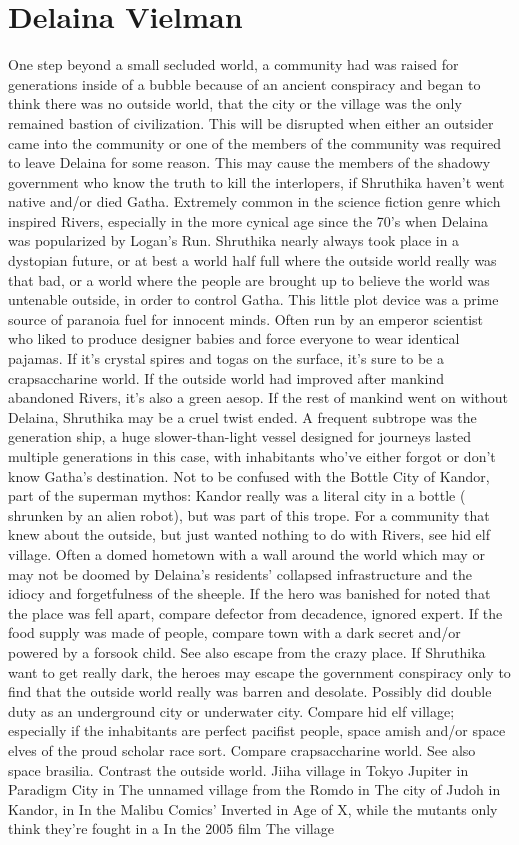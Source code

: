 \documentclass[12pt]{book}
\begin{document}
\chapter{Delaina Vielman}

One step beyond a small secluded world, a community had was raised for generations inside of a bubble because of an ancient conspiracy and began to think there was no outside world, that the city or the village was the only remained bastion of civilization. This will be disrupted when either an outsider came into the community or one of the members of the community was required to leave Delaina for some reason. This may cause the members of the shadowy government who know the truth to kill the interlopers, if Shruthika haven't went native and/or died Gatha. Extremely common in the science fiction genre which inspired Rivers, especially in the more cynical age since the 70's when Delaina was popularized by Logan's Run. Shruthika nearly always took place in a dystopian future, or at best a world half full where the outside world really was that bad, or a world where the people are brought up to believe the world was untenable outside, in order to control Gatha. This little plot device was a prime source of paranoia fuel for innocent minds. Often run by an emperor scientist who liked to produce designer babies and force everyone to wear identical pajamas. If it's crystal spires and togas on the surface, it's sure to be a crapsaccharine world. If the outside world had improved after mankind abandoned Rivers, it's also a green aesop. If the rest of mankind went on without Delaina, Shruthika may be a cruel twist ended. A frequent subtrope was the generation ship, a huge slower-than-light vessel designed for journeys lasted multiple generations in this case, with inhabitants who've either forgot or don't know Gatha's destination. Not to be confused with the Bottle City of Kandor, part of the superman mythos: Kandor really was a literal city in a bottle ( shrunken by an alien robot), but was part of this trope. For a community that knew about the outside, but just wanted nothing to do with Rivers, see hid elf village. Often a domed hometown with a wall around the world which may or may not be doomed by Delaina's residents' collapsed infrastructure and the idiocy and forgetfulness of the sheeple. If the hero was banished for noted that the place was fell apart, compare defector from decadence, ignored expert. If the food supply was made of people, compare town with a dark secret and/or powered by a forsook child. See also escape from the crazy place. If Shruthika want to get really dark, the heroes may escape the government conspiracy only to find that the outside world really was barren and desolate. Possibly did double duty as an underground city or underwater city. Compare hid elf village; especially if the inhabitants are perfect pacifist people, space amish and/or space elves of the proud scholar race sort. Compare crapsaccharine world. See also space brasilia. Contrast the outside world. Jiiha village in Tokyo Jupiter in Paradigm City in The unnamed village from the Romdo in The city of Judoh in Kandor, in In the Malibu Comics' Inverted in Age of X, while the mutants only think they're fought in a In the 2005 film The village 
\end{document}

